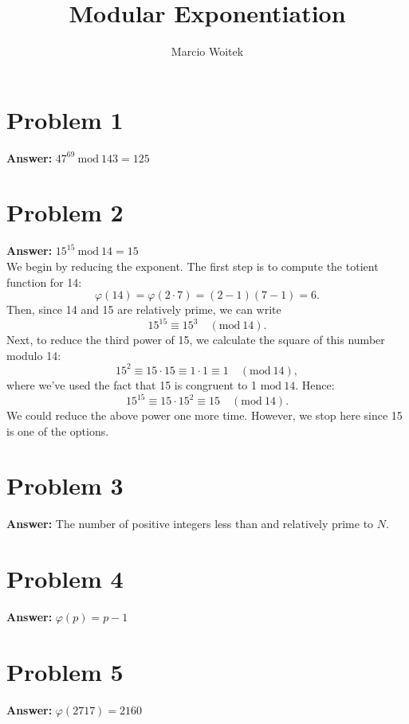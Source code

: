 \documentclass[11pt]{article}
\author{Marcio Woitek}
\date{}
\title{Modular Exponentiation}
\newcommand{\Mod}{\mathrm{mod}\:}
\begin{document}
\maketitle
\thispagestyle{empty}
\pagestyle{empty}
\section*{Problem 1}
\label{sec:org6314d71}
\textbf{Answer:} \(47^{69}\:\Mod 143=125\)
\section*{Problem 2}
\label{sec:org1418c7d}
\textbf{Answer:} \(15^{15}\:\Mod 14=15\)\\

We begin by reducing the exponent. The first step is to compute the totient
function for 14:
\begin{equation}
\varphi(14)=\varphi(2\cdot 7)=(2-1)(7-1)=6.
\end{equation}
Then, since 14 and 15 are relatively prime, we can write
\begin{equation}
15^{15}\equiv 15^3\quad(\Mod 14).
\end{equation}
Next, to reduce the third power of 15, we calculate the square of this number
modulo 14:
\begin{equation}
15^2\equiv 15\cdot 15\equiv 1\cdot 1\equiv 1\quad(\Mod 14),
\end{equation}
where we've used the fact that 15 is congruent to 1 \(\Mod 14\). Hence:
\begin{equation}
15^{15}\equiv 15\cdot 15^2\equiv 15\quad(\Mod 14).
\end{equation}
We could reduce the above power one more time. However, we stop here since 15 is
one of the options.
\section*{Problem 3}
\label{sec:orgaa166f9}
\textbf{Answer:} The number of positive integers less than and relatively prime to \(N\).
\section*{Problem 4}
\label{sec:org9f22119}
\textbf{Answer:} \(\varphi(p)=p-1\)
\section*{Problem 5}
\label{sec:orgc9c324f}
\textbf{Answer:} \(\varphi(2717)=2160\)\\
\end{document}
